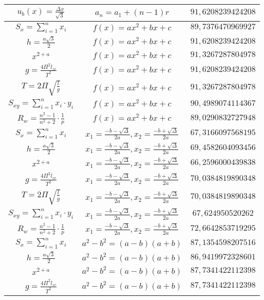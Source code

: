 \documentclass{article}
\begin{document}
\begin{flushleft}
\begin{longtable}{|c|c|c|}
$u_b(x)=\frac{\Delta x}{\sqrt{3}}$ & $a_n=a_1+(n-1)r$ & $91,6208239424208$ \\ \hline 
$S_x=\sum_{i=1}^{n}x_i$ & $f(x)=ax^2+bx+c$ & $89,7376470969927$ \\ \hline 
$h=\frac{a\sqrt{3}}{2}$ & $f(x)=ax^2+bx+c$ & $91,6208239424208$ \\ \hline 
$x^{2+a}$ & $f(x)=ax^2+bx+c$ & $91,3267287804978$ \\ \hline 
$g=\frac{4\Pi ^2l_{zr}}{T^2}$ & $f(x)=ax^2+bx+c$ & $91,6208239424208$ \\ \hline 
$T=2\Pi \sqrt{\frac{l}{g}}$ & $f(x)=ax^2+bx+c$ & $91,3267287804978$ \\ \hline 
$S_{xy}=\sum_{i=1}^{n}x_i\cdot y_i$ & $f(x)=ax^2+bx+c$ & $90,4989074114367$ \\ \hline 
$R_w=\frac{n^2-1}{n^2+2}\cdot \frac{1}{p}$ & $f(x)=ax^2+bx+c$ & $89,0290832727948$ \\ \hline 
$S_x=\sum_{i=1}^{n}x_i$ & $x_1=\frac{-b-\sqrt{\Delta }}{2a},x_2=\frac{-b+\sqrt{\Delta }}{2a}$ & $67,3166097568195$ \\ \hline 
$h=\frac{a\sqrt{3}}{2}$ & $x_1=\frac{-b-\sqrt{\Delta }}{2a},x_2=\frac{-b+\sqrt{\Delta }}{2a}$ & $69,4582604093456$ \\ \hline 
$x^{2+a}$ & $x_1=\frac{-b-\sqrt{\Delta }}{2a},x_2=\frac{-b+\sqrt{\Delta }}{2a}$ & $66,2596000439838$ \\ \hline 
$g=\frac{4\Pi ^2l_{zr}}{T^2}$ & $x_1=\frac{-b-\sqrt{\Delta }}{2a},x_2=\frac{-b+\sqrt{\Delta }}{2a}$ & $70,0384819890348$ \\ \hline 
$T=2\Pi \sqrt{\frac{l}{g}}$ & $x_1=\frac{-b-\sqrt{\Delta }}{2a},x_2=\frac{-b+\sqrt{\Delta }}{2a}$ & $70,0384819890348$ \\ \hline 
$S_{xy}=\sum_{i=1}^{n}x_i\cdot y_i$ & $x_1=\frac{-b-\sqrt{\Delta }}{2a},x_2=\frac{-b+\sqrt{\Delta }}{2a}$ & $67,624950520262$ \\ \hline 
$R_w=\frac{n^2-1}{n^2+2}\cdot \frac{1}{p}$ & $x_1=\frac{-b-\sqrt{\Delta }}{2a},x_2=\frac{-b+\sqrt{\Delta }}{2a}$ & $72,6642853719295$ \\ \hline 
$S_x=\sum_{i=1}^{n}x_i$ & $a^2-b^2=(a-b)(a+b)$ & $87,1354598207516$ \\ \hline 
$h=\frac{a\sqrt{3}}{2}$ & $a^2-b^2=(a-b)(a+b)$ & $86,9419972328601$ \\ \hline 
$x^{2+a}$ & $a^2-b^2=(a-b)(a+b)$ & $87,7341422112398$ \\ \hline 
$g=\frac{4\Pi ^2l_{zr}}{T^2}$ & $a^2-b^2=(a-b)(a+b)$ & $87,7341422112398$ \\ \hline 

\end{longtable}
\end{flushleft}
\end{document}

